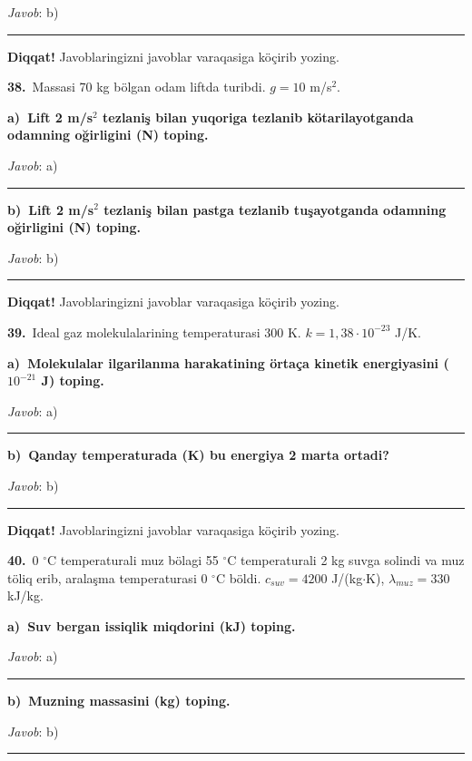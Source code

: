 \documentclass[11pt,a4paper]{article}
\newcommand{\blank}{\rule{5cm}{0.4pt}}
\begin{document}
\noindent\textit{Javob}: b)\ \blank\par
\medskip\noindent\textbf{Diqqat!} Javoblaringizni javoblar varaqasiga köçirib yozing.\par\vspace{10pt}
\noindent\textbf{38.}\ Massasi 70 kg bölgan odam liftda turibdi. $g=10$ m/s$^2$.\par\smallskip
\medskip\noindent\textbf{a)\ Lift 2 m/s$^2$ tezlaniş bilan yuqoriga tezlanib kötarilayotganda odamning oğirligini (N) toping.}\par
\noindent\textit{Javob}: a)\ \blank\par
\medskip\noindent\textbf{b)\ Lift 2 m/s$^2$ tezlaniş bilan pastga tezlanib tuşayotganda odamning oğirligini (N) toping.}\par
\noindent\textit{Javob}: b)\ \blank\par
\medskip\noindent\textbf{Diqqat!} Javoblaringizni javoblar varaqasiga köçirib yozing.\par\vspace{10pt}
\noindent\textbf{39.}\ Ideal gaz molekulalarining temperaturasi 300 K. $k=1{,}38\cdot10^{-23}$ J/K.\par\smallskip
\medskip\noindent\textbf{a)\ Molekulalar ilgarilanma harakatining örtaça kinetik energiyasini ($10^{-21}$ J) toping.}\par
\noindent\textit{Javob}: a)\ \blank\par
\medskip\noindent\textbf{b)\ Qanday temperaturada (K) bu energiya 2 marta ortadi?}\par
\noindent\textit{Javob}: b)\ \blank\par
\medskip\noindent\textbf{Diqqat!} Javoblaringizni javoblar varaqasiga köçirib yozing.\par\vspace{10pt}
\noindent\textbf{40.}\ 0 $^\circ$C temperaturali muz bölagi 55 $^\circ$C temperaturali 2 kg suvga solindi va muz töliq erib, aralaşma temperaturasi 0 $^\circ$C böldi. $c_{suv}=4200$ J/(kg$\cdot$K), $\lambda_{muz}=330$ kJ/kg.\par\smallskip
\medskip\noindent\textbf{a)\ Suv bergan issiqlik miqdorini (kJ) toping.}\par
\noindent\textit{Javob}: a)\ \blank\par
\medskip\noindent\textbf{b)\ Muzning massasini (kg) toping.}\par
\noindent\textit{Javob}: b)\ \blank\par
\end{document}
